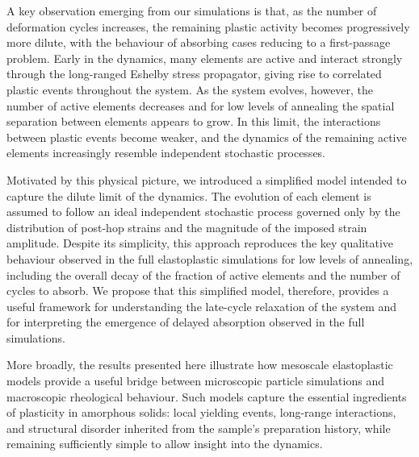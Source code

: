 A key observation emerging from our simulations is that, as the number of deformation cycles increases, the remaining plastic activity becomes progressively more dilute, with the behaviour of absorbing cases reducing to a first-passage problem. Early in the dynamics, many elements are active and interact strongly through the long-ranged Eshelby stress propagator, giving rise to correlated plastic events throughout the system. As the system evolves, however, the number of active elements decreases and for low levels of annealing the spatial separation between elements appears to grow. In this limit, the interactions between plastic events become weaker, and the dynamics of the remaining active elements increasingly resemble independent stochastic processes.

Motivated by this physical picture, we introduced a simplified model intended to capture the dilute limit of the dynamics. The evolution of each element is assumed to follow an ideal independent stochastic process governed only by the distribution of post-hop strains and the magnitude of the imposed strain amplitude. Despite its simplicity, this approach reproduces the key qualitative behaviour observed in the full elastoplastic simulations for low levels of annealing, including the overall decay of the fraction of active elements and the number of cycles to absorb. We propose that this simplified model, therefore, provides a useful framework for understanding the late-cycle relaxation of the system and for interpreting the emergence of delayed absorption observed in the full simulations.

More broadly, the results presented here illustrate how mesoscale elastoplastic models provide a useful bridge between microscopic particle simulations and macroscopic rheological behaviour. Such models capture the essential ingredients of plasticity in amorphous solids: local yielding events, long-range interactions, and structural disorder inherited from the sample's preparation history, while remaining sufficiently simple to allow insight into the dynamics.


